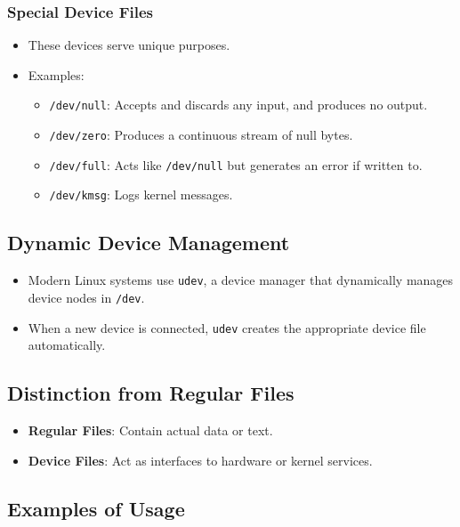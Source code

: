 \subsubsection*{Special Device Files}
\begin{itemize}
    \item These devices serve unique purposes.
    \item Examples:
    \begin{itemize}
        \item \texttt{/dev/null}: Accepts and discards any input, and produces no output.
        \item \texttt{/dev/zero}: Produces a continuous stream of null bytes.
        \item \texttt{/dev/full}: Acts like \texttt{/dev/null} but generates an error if written to.
        \item \texttt{/dev/kmsg}: Logs kernel messages.
    \end{itemize}
\end{itemize}

\subsection*{Dynamic Device Management}

\begin{itemize}
    \item Modern Linux systems use \texttt{udev}, a device manager that dynamically manages device nodes in \texttt{/dev}.
    \item When a new device is connected, \texttt{udev} creates the appropriate device file automatically.
\end{itemize}

\subsection*{Distinction from Regular Files}

\begin{itemize}
    \item \textbf{Regular Files}: Contain actual data or text.
    \item \textbf{Device Files}: Act as interfaces to hardware or kernel services.
\end{itemize}

\subsection*{Examples of Usage}

